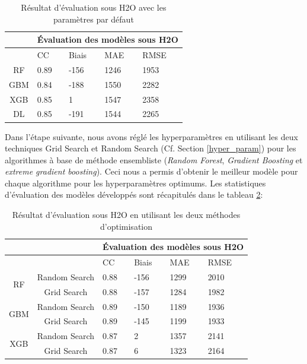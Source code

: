 \begin{table}[!ht]
    \centering
    \begin{tabular}{ |c|p{2cm}|p{2cm}|p{2cm}|p{2cm}|  }
     \hline
     & \multicolumn{4}{|c|}{Évaluation des modèles sous H2O} \\
     \hline
     & CC & Biais & MAE & RMSE\\
     \hline
     RF & 0.89 & -156 & 1246 & 1953\\
     \hline
     GBM &  0.84 & -188 & 1550 & 2282 \\
     \hline
     XGB & 0.85 & 1 & 1547 & 2358\\
     \hline
     DL &  0.85 & -191 & 1544 & 2265\\
    \hline
    \end{tabular}
    \caption{Résultat d'évaluation sous H2O avec les paramètres par défaut}
    \label{h2O_default}
\end{table}

Dans l'étape suivante, nous avons réglé les hyperparamètres en utilisant les deux techniques Grid Search et Random Search (Cf. Section \ref{hyper_param}) pour les algorithmes à base de méthode ensembliste (\textit{Random Forest}, \textit{Gradient Boosting} et \textit{extreme gradient boosting}). Ceci nous a permis d'obtenir le meilleur modèle pour chaque algorithme pour les hyperparamètres optimums. Les statistiques d'évaluation des modèles développés sont récapitulés dans le tableau \ref{h2o_ev_Tuning}:\\

\begin{table}[!ht]
    \centering
    \begin{tabular}{ |c|c|p{2cm}|p{2cm}|p{2cm}|p{2cm}|  }
     \hline
     \multicolumn{2}{|c|}{} &\multicolumn{4}{|c|}{Évaluation des modèles sous H2O} \\
     \hline
     \multicolumn{2}{|c|}{} & CC & Biais & MAE & RMSE\\
     \hline
    \multirow{2}{*}{RF} &
     Random Search & 0.88 & -156 & 1299 & 2010\\
     & Grid Search & 0.88 & -157 & 1284 & 1982\\
     \hline
     \multirow{2}{*}{GBM} &
     Random Search  & 0.89 & -150 & 1189 & 1936\\
     & Grid Search & 0.89 & -145 & 1199 & 1933\\
     \hline
     \multirow{2}{*}{XGB} &
     Random Search  & 0.87 & 2 & 1357  & 2141 \\
     & Grid Search  & 0.87 & 6 & 1323  & 2164 \\
     \hline
    \end{tabular}
    \caption{Résultat d'évaluation sous H2O en utilisant les deux méthodes d'optimisation}
    \label{h2o_ev_Tuning}
\end{table}

